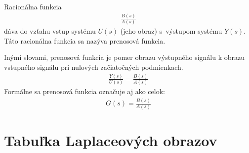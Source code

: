 \documentclass[a4paper, 10pt, ]{article}
\begin{document}
Racionálna funkcia
\begin{align}
    \frac{B(s)}{A(s)}
\end{align}
dáva do vzťahu vstup systému $U(s)$ (jeho obraz) s~výstupom systému $Y(s)$. Táto racionálna funkcia sa nazýva prenosová funkcia.

Inými slovami, prenosová funkcia je pomer obrazu výstupného signálu k obrazu vstupného signálu pri nulových začiatočných podmienkach.
\begin{align}
    \frac{Y(s)}{U(s)} = \frac{B(s)}{A(s)}
\end{align}
Formálne sa prenosová funkcia označuje aj ako celok:
\begin{align}
    G(s) = \frac{B(s)}{A(s)}
\end{align}






\section{Tabuľka Laplaceových obrazov}
\label{Tabuľka Laplaceových obrazov}







\newcommand{\Laplace}[1]{\ensuremath{\mathcal{L}{\left\{#1\right\}}}}
\newcommand{\InvLap}[1]{\ensuremath{\mathcal{L}^{-1}{\left\{#1\right\}}}}
\end{document}
